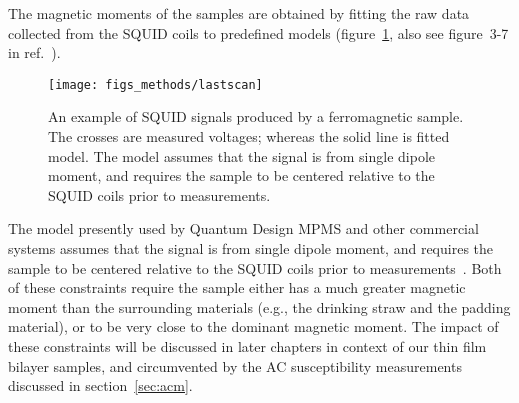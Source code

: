 The magnetic moments of the samples are obtained by fitting the raw data collected from the SQUID coils to predefined models (figure~\ref{fig:lastscan}, also see figure~3-7 in ref.~\cite{mpms_software}). %
\begin{figure}[ht]%
	\centering%
    \texttt{[image: figs\_methods/lastscan]}%
    \caption[An example of SQUID magnetometry data]{\label{fig:lastscan}An example of SQUID signals produced by a ferromagnetic sample. The crosses are measured voltages; whereas the solid line is fitted model. The model assumes that the signal is from single dipole moment, and requires the sample to be centered relative to the SQUID coils prior to measurements.}%
\end{figure}%
The model presently used by Quantum Design MPMS and other commercial systems assumes that the signal is from single dipole moment, and requires the sample to be centered relative to the SQUID coils prior to measurements~\cite{mpms_software, squid_bg, squid_center_error}. Both of these constraints require the sample either has a much greater magnetic moment than the surrounding materials (e.g., the drinking straw and the padding material), or to be very close to the dominant magnetic moment. The impact of these constraints will be discussed in later chapters in context of our thin film bilayer samples, and circumvented by the AC susceptibility measurements discussed in section~\ref{sec:acm}.